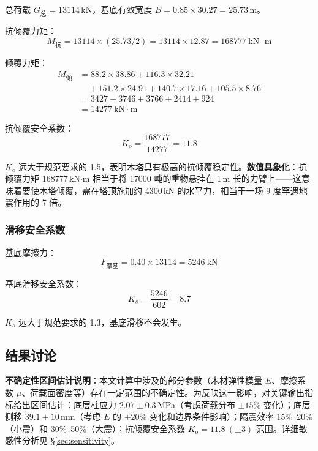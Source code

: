 \documentclass[12pt,a4paper,UTF8]{ctexart}
\begin{document}
总荷载 $G_{\text{总}} = 13114$\,kN，基底有效宽度 $B = 0.85 \times 30.27 = 25.73$\,m。

抗倾覆力矩：
\[
    M_{\text{抗}} = 13114 \times (25.73 / 2) = 13114 \times 12.87 = 168777\ \text{kN}\cdot\text{m}
\]

倾覆力矩：
\[
    \begin{aligned}
        M_{\text{倾}} & = 88.2 \times 38.86 + 116.3 \times 32.21                            \\
                     & \quad + 151.2 \times 24.91 + 140.7 \times 17.16 + 105.5 \times 8.76 \\
                     & = 3427 + 3746 + 3766 + 2414 + 924                                   \\
                     & = 14277\ \text{kN}\cdot\text{m}
    \end{aligned}
\]

抗倾覆安全系数：
\[
    K_o = \frac{168777}{14277} = 11.8
\]

$K_o$ 远大于规范要求的 1.5，表明木塔具有极高的抗倾覆稳定性。\textbf{数值具象化}：抗倾覆力矩 168777\,kN$\cdot$m 相当于将 17000 吨的重物悬挂在 1\,m 长的力臂上——这意味着要使木塔倾覆，需在塔顶施加约 4300\,kN 的水平力，相当于一场 9 度罕遇地震作用的 7 倍。

\subsubsection{滑移安全系数}

基底摩擦力：
\[
    F_{\text{摩基}} = 0.40 \times 13114 = 5246\ \text{kN}
\]

基底滑移安全系数：
\[
    K_s = \frac{5246}{602} = 8.7
\]

$K_s$ 远大于规范要求的 1.3，基底滑移不会发生。

\subsection{结果讨论}

\textbf{不确定性区间估计说明}：本文计算中涉及的部分参数（木材弹性模量 $E$、摩擦系数 $\mu$、荷载面密度等）存在一定范围的不确定性。为反映这一影响，对关键输出指标给出区间估计：底层柱应力 $2.07 \pm 0.3$\,MPa（考虑荷载分布 $\pm 15\%$ 变化）；底层侧移 $39.1 \pm 10$\,mm（考虑 $E$ 的 $\pm 20\%$ 变化和边界条件影响）；隔震效率 15\%~20\%（小震）和 30\%~50\%（大震）；抗倾覆安全系数 $K_o = 11.8\ (\pm 3)$ 范围。详细敏感性分析见 §\ref{sec:sensitivity}。
\end{document}
